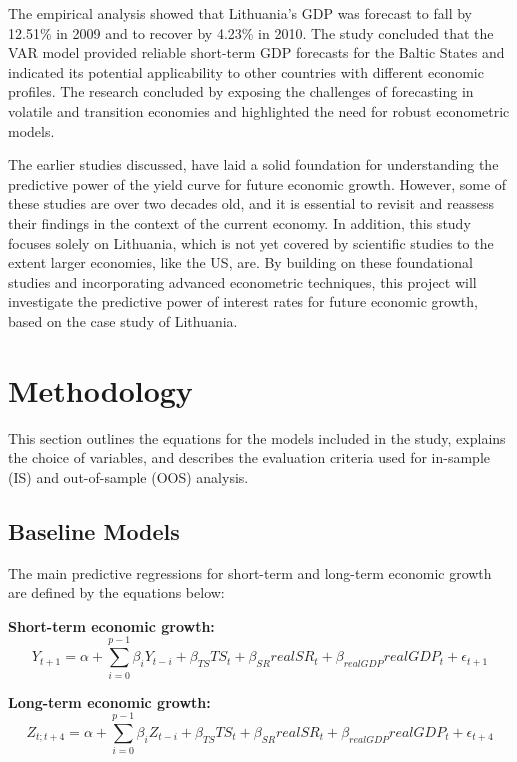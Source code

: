 \documentclass[12pt]{article}
\begin{document}
The empirical analysis showed that Lithuania's GDP was forecast to fall by 12.51\% in 2009 and to recover by 4.23\% in 2010. The study concluded that the VAR model provided reliable short-term GDP forecasts for the Baltic States and indicated its potential applicability to other countries with different economic profiles. The research concluded by exposing the challenges of forecasting in volatile and transition economies and highlighted the need for robust econometric models.

The earlier studies discussed, have laid a solid foundation for understanding the predictive power of the yield curve for future economic growth. However, some of these studies are over two decades old, and it is essential to revisit and reassess their findings in the context of the current economy. In addition, this study focuses solely on Lithuania, which is not yet covered by scientific studies to the extent larger economies, like the US, are. By building on these foundational studies and incorporating advanced econometric techniques, this project will investigate the predictive power of interest rates for future economic growth, based on the case study of Lithuania.
\newpage

\section{Methodology}

This section outlines the equations for the models included in the study, explains the choice of variables, and describes the evaluation criteria used for in-sample (IS) and out-of-sample (OOS) analysis.

\subsection{Baseline Models}

The main predictive regressions for short-term and long-term economic growth are defined by the equations below:

\textbf{Short-term economic growth:}
\begin{equation}
    Y_{t+1} = \alpha + \sum_{i=0}^{p-1} \beta_i Y_{t-i} + \beta_{TS} TS_t + \beta_{SR} realSR_t + \beta_{realGDP} realGDP_t + \epsilon_{t+1}
\end{equation}

\textbf{Long-term economic growth:}
\begin{equation}
    Z_{t;t+4} = \alpha + \sum_{i=0}^{p-1} \beta_i Z_{t-i} + \beta_{TS} TS_t + \beta_{SR} realSR_t + \beta_{realGDP} realGDP_t + \epsilon_{t+4}
\end{equation}
\end{document}
